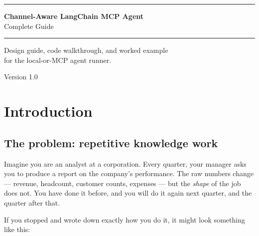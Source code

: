 \documentclass[12pt, a4paper]{article}
\begin{document}
\begin{titlepage}
  \centering
  \vspace*{3cm}
  {\color{primary}\rule{\linewidth}{2pt}}
  \vspace{1cm}

  {\Huge\bfseries\color{darktext} Channel-Aware LangChain MCP Agent}\\[0.5em]
  {\Large\color{mutedtext} Complete Guide}

  \vspace{1cm}
  {\color{primary}\rule{\linewidth}{2pt}}

  \vspace{2cm}
  {\large\color{mutedtext}
    Design guide, code walkthrough, and worked example\\
    for the local-or-MCP agent runner.
  }

  \vfill
  {\small\color{mutedtext} Version 1.0}
\end{titlepage}

\tableofcontents
\newpage

\section{Introduction}

\subsection{The problem: repetitive knowledge work}

Imagine you are an analyst at a corporation. Every quarter, your manager asks you to produce a report on the company's performance. The raw numbers change --- revenue, headcount, customer counts, expenses --- but the \textit{shape} of the job does not. You have done it before, and you will do it again next quarter, and the quarter after that.

If you stopped and wrote down exactly how you do it, it might look something like this:
\end{document}
